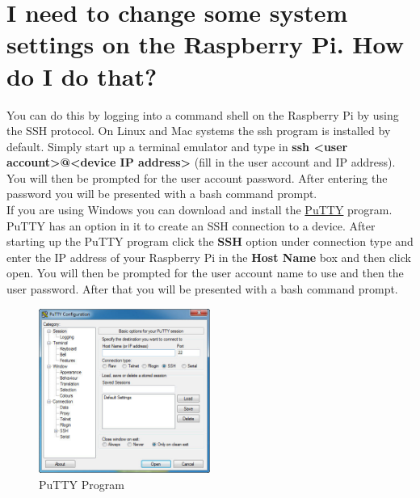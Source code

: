 \documentclass{article}
\begin{document}
\section{I need to change some system settings on the Raspberry Pi. How do I do that?}

You can do this by logging into a command shell on the Raspberry Pi by using the SSH protocol. On Linux and Mac systems the ssh program is installed by default. Simply start up a terminal emulator and type in \textbf{ssh \textless user account\textgreater @\textless device IP address\textgreater} (fill in the user account and IP address). You will then be prompted for the user account password. After entering the password you will be presented with a bash command prompt. \\

If you are using Windows you can download and install the \href{http://www.chiark.greenend.org.uk/~sgtatham/putty/latest.html}{PuTTY} program. PuTTY has an option in it to create an SSH connection to a device. After starting up the PuTTY program click the \textbf{SSH} option under connection type and enter the IP address of your Raspberry Pi in the \textbf{Host Name} box and then click open. You will then be prompted for the user account name to use and then the user password. After that you will be presented with a bash command prompt.

	\begin{figure}[H]
		\centering
		\includegraphics[width=0.5\textwidth]{pics/putty.jpg}
		\caption{PuTTY Program}
		\label{putty}
	\end{figure} 


\end{document}
